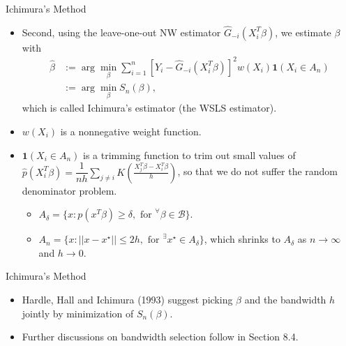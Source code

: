 \documentclass[xcolor=svgnames,dvipdfmx,cjk]{beamer}
\theoremstyle{example}
\begin{document}
\begin{frame}{Ichimura's Method}
  \begin{itemize}
    \item Second, 
          using the leave-one-out NW estimator $\hat{G}_{-i}(X_i^{T}\beta)$,
          we estimate $\beta$ with
          \begin{align*}
            \hat{\beta} 
              &:= \arg \min_{\beta} 
                    \sum_{i=1}^{n}  
                          \left[ Y_i - \hat{G}_{-i}(X_i^{T}\beta) \right]^2 
                          w(X_i) \mathbf{1}(X_i \in A_n) \\
              &:= \arg \min_{\beta} 
                  S_n(\beta),
          \end{align*}
          which is called \alert{Ichimura's estimator (the WSLS estimator)}.
    \item  $w(X_i)$ is a nonnegative weight function.
    \item  $\mathbf{1}(X_i \in A_n)$ is a trimming function to trim out small values of 
           $\hat{p}(X_i^{T}\beta) 
           =
           \dfrac{1}{nh} \sum_{j \neq i} 
              K \left( \frac
                       {X_j^{T}\beta - X_i^{T}\beta}
                       {h} 
                \right) $,
           so that we do not suffer the random denominator problem. 
        \begin{itemize}
          \item $A_\delta = \{ x: p(x^{T}\beta) \geq \delta, \text{ for } ^\forall \beta \in \mathcal{B}\}$.
          \item $A_n = \{ x: || x - x^{\star} || \leq 2h, \text{ for } ^\exists x^{\star} \in A_\delta \}$, 
                which shrinks to $A_\delta$ as $n \to \infty$ and $h \to 0$.
        \end{itemize}
  \end{itemize}
\end{frame}

\begin{frame}{Ichimura's Method}
  \begin{itemize}
    \item Hardle, Hall and Ichimura (1993) suggest 
          picking $\beta$ and the bandwidth $h$ jointly
          by minimization of $S_n(\beta)$.
    \item Further discussions on bandwidth selection follow in Section 8.4.
  \end{itemize}
\end{frame}
\end{document}
